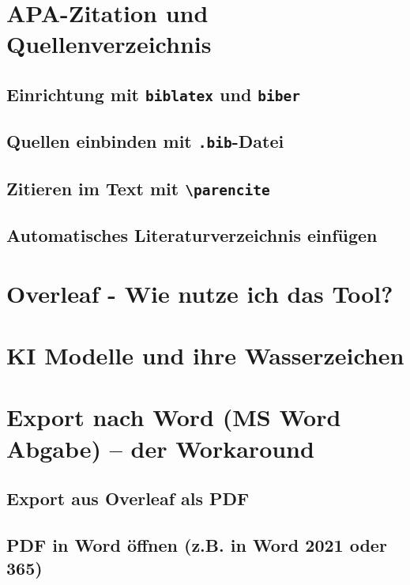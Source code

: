 \cleardoublepage
\tableofcontents

\cleardoublepage







\section{APA-Zitation und Quellenverzeichnis}
\subsection{Einrichtung mit \texttt{biblatex} und \texttt{biber}}
\subsection{Quellen einbinden mit \texttt{.bib}-Datei}
\subsection{Zitieren im Text mit \texttt{\textbackslash parencite}}
\subsection{Automatisches Literaturverzeichnis einfügen}

\section{Overleaf - Wie nutze ich das Tool?}

\section{KI Modelle und ihre Wasserzeichen}

\section{Export nach Word (MS Word Abgabe) – der Workaround}
\subsection{Export aus Overleaf als PDF}
\subsection{PDF in Word öffnen (z.B. in Word 2021 oder 365)}

